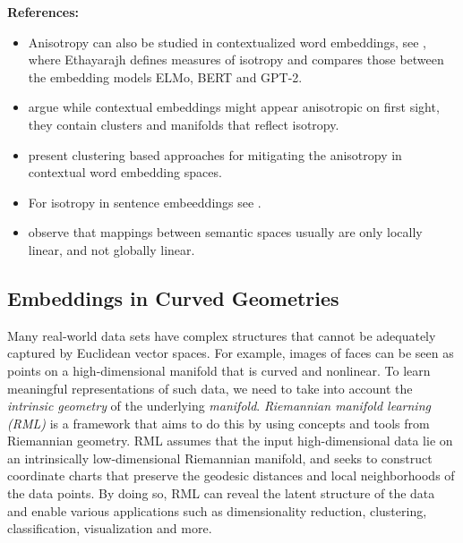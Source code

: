 \documentclass[11pt, a4paper]{amsart}
\begin{document}
\noindent \textbf{References:}
\begin{itemize}
	\item Anisotropy can also be studied in contextualized word embeddings, see \cite{ethayarajh-2019-contextual}, where Ethayarajh defines measures of isotropy and compares those between the embedding models ELMo, BERT and GPT-2.
	\item \cite{cai2021isotropy} argue while contextual embeddings might appear anisotropic on first sight, they contain clusters and manifolds that reflect isotropy.
	\item \cite{rajaee-pilehvar-2021-cluster} present clustering based approaches for mitigating the anisotropy in contextual word embedding spaces.
	\item For isotropy in sentence embeeddings see \cite{li-etal-2020-sentence}.
	\item \cite{nakashole-flauger-2018-characterizing} observe that mappings between semantic spaces usually are only locally linear, and not globally linear.
\end{itemize}


\subsection{Embeddings in Curved Geometries}

Many real-world data sets have complex structures that cannot be adequately captured by Euclidean vector spaces.
For example, images of faces can be seen as points on a high-dimensional manifold that is curved and nonlinear.
To learn meaningful representations of such data, we need to take into account the \emph{intrinsic geometry} of the underlying \emph{manifold}.
\emph{Riemannian manifold learning (RML)} is a framework that aims to do this by using concepts and tools from Riemannian geometry.
RML assumes that the input high-dimensional data lie on an intrinsically low-dimensional Riemannian manifold, and seeks to construct coordinate charts that preserve the geodesic distances and local neighborhoods of the data points. 
By doing so, RML can reveal the latent structure of the data and enable various applications such as dimensionality reduction, clustering, classification, visualization and more.
\end{document}
